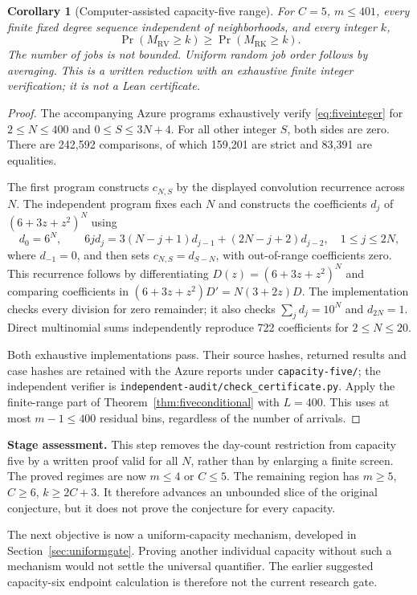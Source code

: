 \documentclass[11pt]{article}
\newtheorem{corollary}{Corollary}
\newcommand{\RV}{\mathrm{RV}}
\newcommand{\RK}{\mathrm{RK}}
\begin{document}
\begin{corollary}[Computer-assisted capacity-five range]\label{cor:fivefinite}
For $C=5$, $m\leq401$, every finite fixed degree sequence independent
of neighborhoods, and every integer $k$,
\[
 \Pr(M_\RV\geq k)\geq\Pr(M_\RK\geq k).
\]
The number of jobs is not bounded. Uniform random job order follows
by averaging. This is a written reduction with an exhaustive finite
integer verification; it is not a Lean certificate.
\end{corollary}
\begin{proof}
The accompanying Azure programs exhaustively verify
\eqref{eq:fiveinteger} for $2\leq N\leq400$ and
$0\leq S\leq3N+4$. For all other integer $S$, both sides are zero.
There are 242,592 comparisons, of which 159,201 are strict and
83,391 are equalities.

The first program constructs $c_{N,S}$ by the displayed convolution
recurrence across $N$. The independent program fixes each $N$ and
constructs the coefficients $d_j$ of $(6+3z+z^2)^N$ using
\[
 d_0=6^N,\qquad
 6j d_j=3(N-j+1)d_{j-1}+(2N-j+2)d_{j-2},
 \quad 1\leq j\leq2N,
\]
where $d_{-1}=0$, and then sets $c_{N,S}=d_{S-N}$, with
out-of-range coefficients zero. This recurrence follows by
differentiating $D(z)=(6+3z+z^2)^N$ and comparing coefficients
in $(6+3z+z^2)D'=N(3+2z)D$. The implementation checks every
division for zero remainder; it also checks $\sum_jd_j=10^N$
and $d_{2N}=1$. Direct multinomial sums independently reproduce
722 coefficients for $2\leq N\leq20$.

Both exhaustive implementations pass. Their source hashes, returned
results and case hashes are retained with the Azure reports under
\texttt{capacity-five/}; the independent verifier is
\texttt{independent-audit/check\_certificate.py}. Apply the
finite-range part of Theorem~\ref{thm:fiveconditional} with $L=400$.
This uses at most $m-1\leq400$ residual bins, regardless of the
number of arrivals.
\end{proof}

\noindent\textbf{Stage assessment.}
This step removes the day-count restriction from capacity five by a
written proof valid for all $N$, rather than by enlarging a finite
screen. The proved regimes are now $m\leq4$ or $C\leq5$.
The remaining region has $m\geq5$, $C\geq6$, $k\geq2C+3$.
It therefore advances an unbounded slice of the original conjecture,
but it does not prove the conjecture for every capacity.

The next objective is now a uniform-capacity mechanism, developed in
Section~\ref{sec:uniformgate}. Proving another individual capacity
without such a mechanism would not settle the universal quantifier.
The earlier suggested capacity-six endpoint calculation is therefore
not the current research gate.
\end{document}
